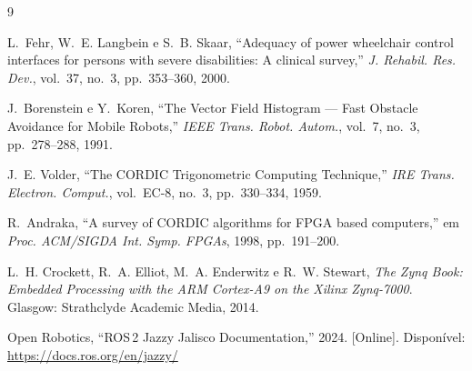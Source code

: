 \documentclass[conference]{IEEEtran}
\begin{document}
\begin{thebibliography}{9}

L.~Fehr, W.~E. Langbein e S.~B. Skaar, ``Adequacy of power wheelchair control
interfaces for persons with severe disabilities: A clinical survey,''
\emph{J. Rehabil. Res. Dev.}, vol.~37, no.~3, pp.~353--360, 2000.

J.~Borenstein e Y.~Koren, ``The Vector Field Histogram --- Fast Obstacle
Avoidance for Mobile Robots,'' \emph{IEEE Trans. Robot. Autom.}, vol.~7, no.~3,
pp.~278--288, 1991.

J.~E. Volder, ``The CORDIC Trigonometric Computing Technique,'' \emph{IRE Trans.
Electron. Comput.}, vol.~EC-8, no.~3, pp.~330--334, 1959.

R.~Andraka, ``A survey of CORDIC algorithms for FPGA based computers,'' em
\emph{Proc. ACM/SIGDA Int. Symp. FPGAs}, 1998, pp.~191--200.

L.~H. Crockett, R.~A. Elliot, M.~A. Enderwitz e R.~W. Stewart, \emph{The Zynq
Book: Embedded Processing with the ARM Cortex-A9 on the Xilinx Zynq-7000}.
Glasgow: Strathclyde Academic Media, 2014.

Open Robotics, ``ROS\,2 Jazzy Jalisco Documentation,'' 2024. [Online].
Dispon\'ivel: \url{https://docs.ros.org/en/jazzy/}

\end{thebibliography}
\end{document}
